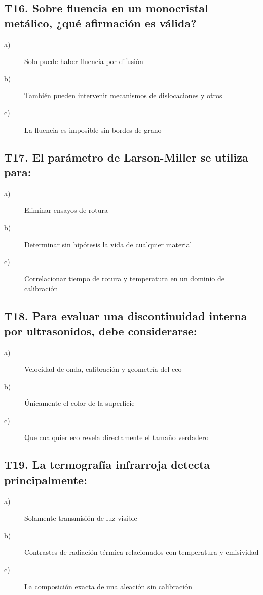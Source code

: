 \subsection*{T16. Sobre fluencia en un monocristal metálico, ¿qué afirmación es válida?}
\begin{description}
\item[a)] Solo puede haber fluencia por difusión
\item[b)] También pueden intervenir mecanismos de dislocaciones y otros
\item[c)] La fluencia es imposible sin bordes de grano
\end{description}

\subsection*{T17. El parámetro de Larson-Miller se utiliza para:}
\begin{description}
\item[a)] Eliminar ensayos de rotura
\item[b)] Determinar sin hipótesis la vida de cualquier material
\item[c)] Correlacionar tiempo de rotura y temperatura en un dominio de calibración
\end{description}

\subsection*{T18. Para evaluar una discontinuidad interna por ultrasonidos, debe considerarse:}
\begin{description}
\item[a)] Velocidad de onda, calibración y geometría del eco
\item[b)] Únicamente el color de la superficie
\item[c)] Que cualquier eco revela directamente el tamaño verdadero
\end{description}

\subsection*{T19. La termografía infrarroja detecta principalmente:}
\begin{description}
\item[a)] Solamente transmisión de luz visible
\item[b)] Contrastes de radiación térmica relacionados con temperatura y emisividad
\item[c)] La composición exacta de una aleación sin calibración
\end{description}

